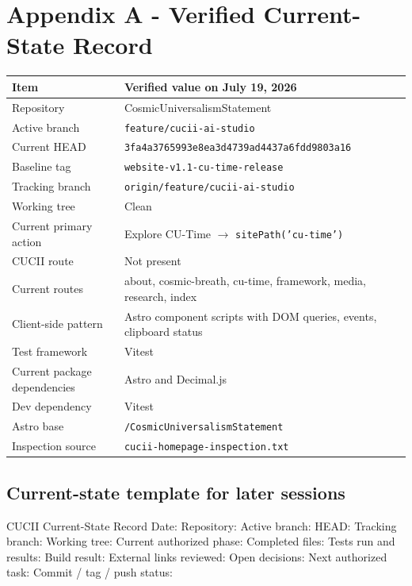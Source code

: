 \documentclass[11pt,letterpaper]{article}
\newcommand{\RepositoryName}{CosmicUniversalismStatement}
\newcommand{\filepath}[1]{\texttt{#1}}
\newcommand{\branchname}[1]{\texttt{#1}}
\begin{document}
\section{Appendix A - Verified Current-State Record}

\begin{tabularx}{\textwidth}{L{2.25in}Y}
\toprule
\textbf{Item} & \textbf{Verified value on July 19, 2026} \\
\midrule
Repository & \RepositoryName \\
Active branch & \branchname{feature/cucii-ai-studio} \\
Current HEAD & \texttt{3fa4a3765993e8ea3d4739ad4437a6fdd9803a16} \\
Baseline tag & \branchname{website-v1.1-cu-time-release} \\
Tracking branch & \texttt{origin/feature/cucii-ai-studio} \\
Working tree & Clean \\
Current primary action & Explore CU-Time $\rightarrow$ \texttt{sitePath('cu-time')} \\
CUCII route & Not present \\
Current routes & about, cosmic-breath, cu-time, framework, media, research, index \\
Client-side pattern & Astro component scripts with DOM queries, events, clipboard status \\
Test framework & Vitest \\
Current package dependencies & Astro and Decimal.js \\
Dev dependency & Vitest \\
Astro base & \texttt{/CosmicUniversalismStatement} \\
Inspection source & \filepath{cucii-homepage-inspection.txt} \\
\bottomrule
\end{tabularx}

\subsection*{Current-state template for later sessions}

\begin{codebox}{CUCII Current-State Record}
Date:
Repository:
Active branch:
HEAD:
Tracking branch:
Working tree:
Current authorized phase:
Completed files:
Tests run and results:
Build result:
External links reviewed:
Open decisions:
Next authorized task:
Commit / tag / push status:
\end{codebox}
\end{document}
